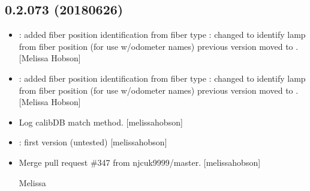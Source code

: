 \documentclass[a4paper,10pt,english]{report}
\begin{document}
\subsection{0.2.073 (2018\sphinxhyphen{}06\sphinxhyphen{}26)}
\label{\detokenize{misc/changelog:id429}}\begin{itemize}
\item {} 
: added fiber position identification from fiber
type : \sphinxhyphen{} changed to identify lamp from
fiber position (for use w/odometer names) \sphinxhyphen{} previous version moved to
. {[}Melissa Hobson{]}

\item {} 
: added fiber position identification from fiber
type : \sphinxhyphen{} changed to identify lamp from
fiber position (for use w/odometer names) \sphinxhyphen{} previous version moved to
. {[}Melissa Hobson{]}

\item {} 
Log calibDB match method. {[}melissa\sphinxhyphen{}hobson{]}

\item {} 
: first version (untested) {[}melissa\sphinxhyphen{}hobson{]}

\item {} 
Merge pull request \#347 from njcuk9999/master. {[}melissa\sphinxhyphen{}hobson{]}

Melissa

\end{itemize}
\end{document}
